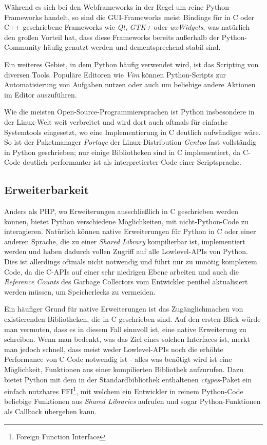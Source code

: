 Während es sich bei den Webframeworks in der Regel um reine Python-Frameworks handelt, so sind die
GUI-Frameworks meist Bindings für in C oder C++ geschriebene Frameworks wie \emph{Qt}, \emph{GTK+}
oder \emph{wxWidgets}, was natürlich den großen Vorteil hat, dass diese Frameworks bereits außerhalb
der Python-Community häufig genutzt werden und dementsprechend stabil sind.

Ein weiteres Gebiet, in dem Python häufig verwendet wird, ist das Scripting von diversen Tools.
Populäre Editoren wie \emph{Vim} können Python-Scripts zur Automatisierung von Aufgaben nutzen oder
auch um beliebige andere Aktionen im Editor auszuführen.

Wie die meisten Open-Source-Programmiersprachen ist Python insbesondere in der Linux-Welt weit
verbreitet und wird dort auch oftmals für einfache Systemtools eingesetzt, wo eine Implementierung
in C deutlich aufwändiger wäre. So ist der Paketmanager \emph{Portage} der
Linux-Distribution \emph{Gentoo} fast vollständig in Python geschrieben; nur einige Bibliotheken
sind in C implementiert, da C-Code deutlich performanter ist als interpretierter Code einer
Scriptsprache.


\subsection{Erweiterbarkeit}

Anders als PHP, wo Erweiterungen ausschließlich in C geschrieben werden können,
bietet Python verschiedene Möglichkeiten, mit nicht-Python-Code zu interagieren. Natürlich können
native Erweiterungen für Python in C oder einer anderen Sprache, die zu einer \emph{Shared Library}
kompilierbar ist, implementiert werden und haben dadurch vollen Zugriff auf alle Lowlevel-APIs
von Python. Dies ist allerdings oftmals nicht notwendig und führt nur zu unnötig komplexem Code, da
die C-APIs auf einer sehr niedrigen Ebene arbeiten und auch die \emph{Reference Counts}
des Garbage Collectors vom Entwickler penibel aktualisiert werden müssen, um Speicherlecks zu
vermeiden.

Ein häufiger Grund für native Erweiterungen ist das Zugänglichmachen von existierenden Bibliotheken,
die in C geschrieben sind. Auf den ersten Blick würde man vermuten, dass es in diesem Fall sinnvoll
ist, eine native Erweiterung zu schreiben. Wenn man bedenkt, was das Ziel eines solchen Interfaces
ist, merkt man jedoch schnell, dass meist weder Lowlevel-APIs noch die erhöhte Performance von
C-Code notwendig ist - alles was benötigt wird ist eine Möglichkeit, Funktionen aus einer
kompilierten Bibliothek aufzurufen. Dazu bietet Python mit dem in der Standardbibliothek enthaltenen
\emph{ctypes}-Paket ein einfach nutzbares FFI\footnote{Foreign Function Interface}, mit welchem ein
Entwickler in reinem Python-Code beliebige Funktionen aus \emph{Shared Libraries} aufrufen und sogar
Python-Funktionen als Callback übergeben kann.

